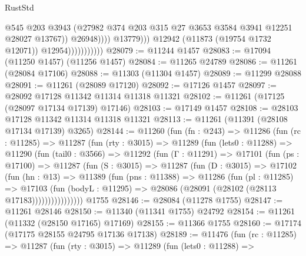 \begin{lexlean}{RustStd}
\begin{coremodule}
                                          @545
                                          @203
                                          @3943
                                          (@27982
                                            @374
                                            @203
                                            @315
                                            @27
                                            @3653
                                            @3584
                                            @3941
                                            @12251
                                            @28027
                                            @13767))
                                        @26948))))
                                @13779)))
                          @12942
                          (@11873 (@19754 @1732 @12071))
                          @12954)))))))))))
@28079 := @11244 @1457
@28083 := @17094 (@11250 @1457) (@11256 @1457)
@28084 := @11265 @24789
@28086 := @11261 (@28084 @17106)
@28088 := @11303 (@11304 @1457)
@28089 := @11299 @28088
@28091 := @11261 (@28089 @17120)
@28092 := @17126 @1457
@28097 := @28092 @17128 @11342 @11314 @11318 @11321
@28102 := @11261 (@17125 (@28097 @17134 @17139) @17146)
@28103 := @17149 @1457
@28108 := @28103 @17128 @11342 @11314 @11318 @11321
@28113 := @11261 (@11391 (@28108 @17134 @17139) @3265)
@28144 := @11260
    (fun (fn : @243) =>
    @11286
      (fun (rc : @11285) =>
      @11287
        (fun (rty : @3015) =>
        @11289
          (fun (lets0 : @11288) =>
          @11290
            (fun (tail0 : @3566) =>
            @11292
              (fun (Γ : @11291) =>
              @17101
                (fun (ps : @17100) =>
                @11287
                  (fun (S : @3015) =>
                  @11287
                    (fun (D : @3015) =>
                    @17102
                      (fun (hn : @13) =>
                      @11389
                        (fun (pns : @11388) =>
                        @11286
                          (fun (pl : @11285) =>
                          @17103
                            (fun (bodyL : @11295) =>
                            @28086 (@28091 (@28102 (@28113 @17183))))))))))))))))
    @1755
@28146 := @28084 (@11278 @1755)
@28147 := @11261 @28146
@28150 := @11340 (@11341 @1755) @24792
@28154 := @11261 (@11332 (@28150 @17165) @17169)
@28155 := @11366 @1755
@28160 := @17174 (@17175 @28155 @24795 @17136 @17138)
@28189 := @11476
    (fun (rc : @11285) =>
    @11287
      (fun (rty : @3015) =>
      @11289
        (fun (lets0 : @11288) =>

\end{coremodule}
\end{lexlean}
